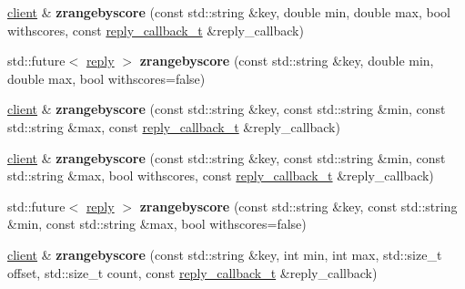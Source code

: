 \begin{DoxyCompactItemize}
\item 
\mbox{\label{classcpp__redis_1_1client_ab2912fb086099e6f6ecbeafcf87d6a04}} 
\mbox{\hyperlink{classcpp__redis_1_1client}{client}} \& {\bfseries zrangebyscore} (const std\+::string \&key, double min, double max, bool withscores, const \mbox{\hyperlink{classcpp__redis_1_1client_af7a65eb21aa25230bfbb0b0203c4fc04}{reply\+\_\+callback\+\_\+t}} \&reply\+\_\+callback)
\item 
\mbox{\label{classcpp__redis_1_1client_ae5b8ba7726075313f9ae36776c7aad22}} 
std\+::future$<$ \mbox{\hyperlink{classcpp__redis_1_1reply}{reply}} $>$ {\bfseries zrangebyscore} (const std\+::string \&key, double min, double max, bool withscores=false)
\item 
\mbox{\label{classcpp__redis_1_1client_a9ec7979a49fb1602708b2f5e4e4b10c8}} 
\mbox{\hyperlink{classcpp__redis_1_1client}{client}} \& {\bfseries zrangebyscore} (const std\+::string \&key, const std\+::string \&min, const std\+::string \&max, const \mbox{\hyperlink{classcpp__redis_1_1client_af7a65eb21aa25230bfbb0b0203c4fc04}{reply\+\_\+callback\+\_\+t}} \&reply\+\_\+callback)
\item 
\mbox{\label{classcpp__redis_1_1client_af77f35c0ebce2efd389753da281a5710}} 
\mbox{\hyperlink{classcpp__redis_1_1client}{client}} \& {\bfseries zrangebyscore} (const std\+::string \&key, const std\+::string \&min, const std\+::string \&max, bool withscores, const \mbox{\hyperlink{classcpp__redis_1_1client_af7a65eb21aa25230bfbb0b0203c4fc04}{reply\+\_\+callback\+\_\+t}} \&reply\+\_\+callback)
\item 
\mbox{\label{classcpp__redis_1_1client_aab381eb8a022e9bd4b4fedab899330b3}} 
std\+::future$<$ \mbox{\hyperlink{classcpp__redis_1_1reply}{reply}} $>$ {\bfseries zrangebyscore} (const std\+::string \&key, const std\+::string \&min, const std\+::string \&max, bool withscores=false)
\item 
\mbox{\label{classcpp__redis_1_1client_a360894bd55d9d65582fb862cdccdfade}} 
\mbox{\hyperlink{classcpp__redis_1_1client}{client}} \& {\bfseries zrangebyscore} (const std\+::string \&key, int min, int max, std\+::size\+\_\+t offset, std\+::size\+\_\+t count, const \mbox{\hyperlink{classcpp__redis_1_1client_af7a65eb21aa25230bfbb0b0203c4fc04}{reply\+\_\+callback\+\_\+t}} \&reply\+\_\+callback)

\end{DoxyCompactItemize}
